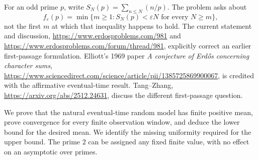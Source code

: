 For an odd prime $p$, write $S_N(p)=\sum_{n\le N}(n/p)$. The problem asks about
\[
 f_\varepsilon(p)=\min\{m\ge1:S_N(p)<\varepsilon N\text{ for every }N\ge m\},
\]
not the first $m$ at which that inequality happens to hold. The current statement and discussion, \url{https://www.erdosproblems.com/981} and \url{https://www.erdosproblems.com/forum/thread/981}, explicitly correct an earlier first-passage formulation. Elliott's 1969 paper \emph{A conjecture of Erd\H{o}s concerning character sums}, \url{https://www.sciencedirect.com/science/article/pii/1385725869900067}, is credited with the affirmative eventual-time result. Tang--Zhang, \url{https://arxiv.org/abs/2512.24631}, discuss the different first-passage question.

We prove that the natural eventual-time random model has finite positive mean, prove convergence for every finite observation window, and deduce the lower bound for the desired mean. We identify the missing uniformity required for the upper bound. The prime $2$ can be assigned any fixed finite value, with no effect on an asymptotic over primes.
